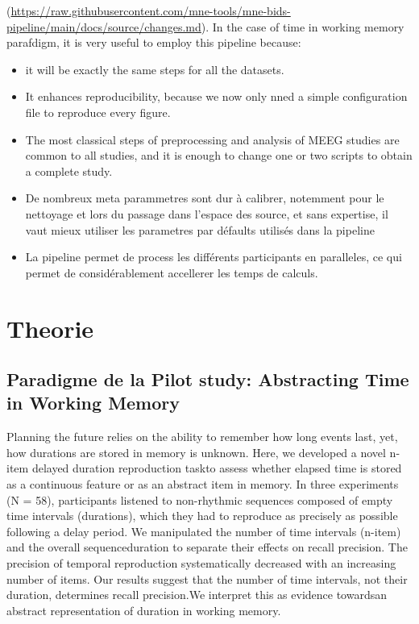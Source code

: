 (\url{https://raw.githubusercontent.com/mne-tools/mne-bids-pipeline/main/docs/source/changes.md}).
In the case of time in working memory parafdigm, it is very useful to employ this pipeline because:
\begin{itemize}
    \item it will be exactly the same steps for all the datasets.
    \item It enhances reproducibility, because we now only nned a simple configuration file to reproduce every figure.
    \item The most classical steps of preprocessing and analysis of MEEG studies are common to all studies, and it is enough to change one or two scripts to obtain a complete study.
    \item De nombreux meta parammetres sont dur à calibrer, notemment pour le nettoyage et lors du passage dans l'espace des source, et sans expertise, il vaut mieux utiliser les parametres par défaults utilisés dans la pipeline
    \item La pipeline permet de process les différents participants en paralleles, ce qui permet de considérablement accellerer les temps de calculs.
\end{itemize}

\section{Theorie}
\subsection{Paradigme de la Pilot study: Abstracting Time in Working Memory}

Planning the future relies on the ability to remember how long events last, yet, how durations  are  stored  in  memory  is  unknown.  Here,  we  developed  a  novel n-item delayed duration reproduction taskto assess whether elapsed time is stored as a continuous feature or as an abstract item in memory. In three experiments (N = 58), participants listened to non-rhythmic sequences composed of empty time intervals (durations), which they had to reproduce as precisely as possible following a delay period.  We  manipulated  the  number  of  time  intervals  (n-item)  and  the  overall sequenceduration  to separate  their effects  on  recall  precision.  The  precision  of temporal reproduction systematically decreased with an increasing number of items. Our results suggest that the number of time intervals, not their duration, determines recall precision.We interpret this as evidence towardsan abstract representation of duration in working memory.

